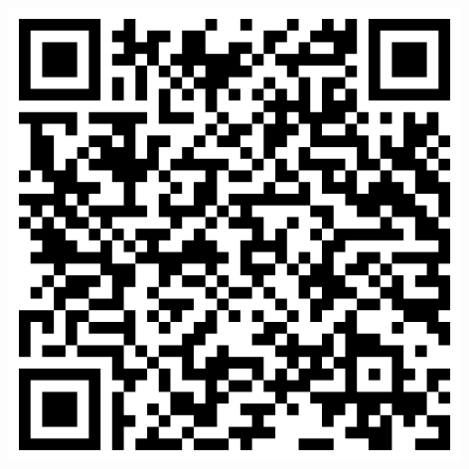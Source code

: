 \documentclass[aspectratio=169,11pt,hyperref={colorlinks=true}]{beamer}
\begin{document}
\begin{blackframe}
\begin{textblock*}{0.15\paperwidth}
    \includegraphics[width=0.15\paperwidth]{img/cdcon2024-slides.png}
  \end{textblock*}
\end{blackframe}
\end{document}
